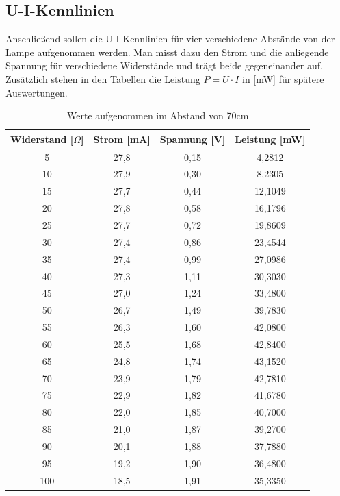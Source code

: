 \subsection{U-I-Kennlinien}
Anschließend sollen die U-I-Kennlinien für vier verschiedene Abstände von der Lampe aufgenommen werden. Man misst dazu den Strom und die anliegende Spannung für verschiedene Widerstände und trägt beide gegeneinander auf. Zusätzlich stehen in den Tabellen die Leistung $P=U \cdot I$ in [mW] für spätere Auswertungen.


\renewcommand{\arraystretch}{0.83}
\begin{table}[H]
\begin{tabular}{|c|c|c|c|}
\hline 
Widerstand [$\Omega$]	&Strom [mA]	&Spannung [V]	&Leistung [mW]\\	
\hline
5	&27,8	&0,15	&4,2812\\
10	&27,9	&0,30	&8,2305\\
15	&27,7	&0,44	&12,1049\\
20	&27,8	&0,58	&16,1796\\
25	&27,7	&0,72	&19,8609\\
30	&27,4	&0,86	&23,4544\\
35	&27,4	&0,99	&27,0986\\
40	&27,3	&1,11	&30,3030\\
45	&27,0	&1,24	&33,4800\\
50	&26,7	&1,49	&39,7830\\
55	&26,3	&1,60	&42,0800\\
60	&25,5	&1,68	&42,8400\\
65	&24,8	&1,74	&43,1520\\
70	&23,9	&1,79	&42,7810\\
75	&22,9	&1,82	&41,6780\\
80	&22,0	&1,85	&40,7000\\
85	&21,0	&1,87	&39,2700\\
90	&20,1	&1,88	&37,7880\\
95	&19,2	&1,90	&36,4800\\
100	&18,5	&1,91	&35,3350\\
\hline 
\end{tabular}
\caption{Werte aufgenommen im Abstand von 70cm}
\end{table}
 
